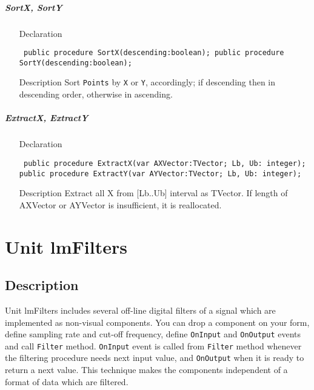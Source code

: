 \documentclass[12pt,a4paper,oneside]{report}
\newcommand{\declarationitem}[1]{{\addfontfeatures{FakeBold=1.3} #1}}
\newcommand{\descriptiontitle}[1]{{\addfontfeatures{FakeSlant}#1}}
\newcommand{\code}[1]{\texttt{#1}}
\begin{document}
\paragraph{SortX, SortY}\hspace*{\fill}
\label{lmPointsVec.TPoints-SortX}
\begin{itemize}\item[\declarationitem{Declaration}\hfill]
	\begin{flushleft}
		\code{
			public procedure SortX(descending:boolean);
			public procedure SortY(descending:boolean);}
	\end{flushleft}
	
	\par
	\item[\descriptiontitle{Description}]
	Sort \code{Points} by \code{X} or \code{Y}, accordingly; if descending then in descending order, otherwise in ascending.
\end{itemize}
\paragraph{ExtractX, ExtractY}\hspace*{\fill}

\label{lmPointsVec.TPoints-ExtractX}
\begin{itemize}\item[\declarationitem{Declaration}\hfill]
	\begin{flushleft}
		\code{
			public procedure ExtractX(var AXVector:TVector; Lb, Ub: integer);
			public procedure ExtractY(var AYVector:TVector; Lb, Ub: integer);}
	\end{flushleft}

	\item[\descriptiontitle{Description}]
	Extract all X from [Lb..Ub] interval as TVector. If length of AXVector or AYVector is insufficient, it is reallocated. 
\end{itemize}
\chapter{Unit lmFilters}
\label{lmfilters}
\section{Description}
Unit lmFilters includes several off-line digital filters of a signal which are implemented as non-visual components. You can drop a component on your form, define sampling rate and cut-off frequency, define \code{OnInput} and \code{OnOutput} events and call \code{Filter} method. \code{OnInput} event is called from \code{Filter} method whenever the filtering procedure needs next input value, and \code{OnOutput} when it is ready to return a next value. This technique makes the components independent of a format of data which are filtered.
\end{document}
